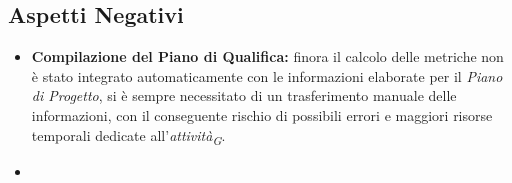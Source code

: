 \subsection{Aspetti Negativi}
\begin{itemize}
    \item \textbf{Compilazione del Piano di Qualifica:} finora il calcolo delle metriche non è stato integrato automaticamente con le informazioni elaborate per il \textit{Piano di Progetto}, si è sempre necessitato di un trasferimento manuale delle informazioni, con il conseguente rischio di possibili errori e maggiori risorse temporali dedicate all'\textit{attività}\textsubscript{\textit{G}}.
    \item {}
\end{itemize}